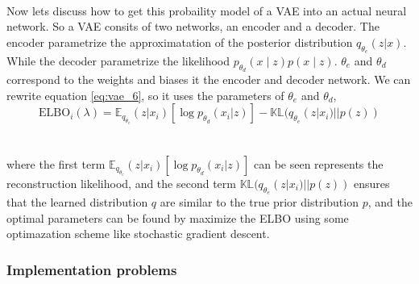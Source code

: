 \documentclass[11pt]{article}
\begin{document}
\\
Now lets discuss how to get this probaility model of a VAE into an actual neural network. So a VAE consits of two networks, an encoder and a decoder. The encoder parametrize the approximatation of the posterior distribution $q_{\theta_{e}} (z | x)$. While the decoder parametrize the likelihood $p_{\theta_{d}}(x \mid z)p(x∣z)$. $\theta_{e}$ and $\theta_{d}$ correspond to the weights and biases it the encoder and decoder network. We can rewrite equation \ref{eq:vae_6}, so it uses the parameters of $\theta_{e}$ and $\theta_{d}$,
\begin{equation}\label{eq:vae_7}
    \text{ELBO}_{i}(\lambda) = \mathds{E}_{q_{\theta_{e}}}(z | x_{i}) [\log p_{\theta_{d}}(x_{i} | z)] - \mathbb{KL}(q_{\theta_{e}} (z | x_{i}) || p(z))
\end{equation}
\\ \\
where the first term $\mathds{E}_{q_{\theta_{e}}}(z | x_{i}) [\log p_{\theta_{d}}(x_{i} | z)]$ can be seen represents the reconstruction likelihood, and the second term $\mathbb{KL}(q_{\theta_{e}} (z | x_{i}) || p(z))$ ensures that the learned distribution $q$ are similar to the true prior distribution $p$, and the optimal parameters can be found by maximize the ELBO using some optimazation scheme like stochastic gradient descent.

\subsubsection{Implementation problems}
\end{document}
